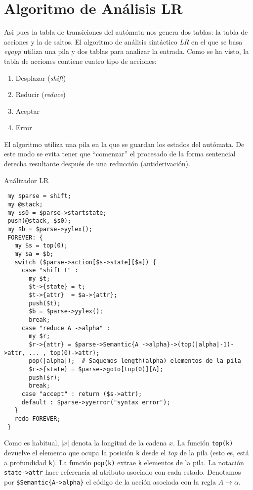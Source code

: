 \section{Algoritmo de Análisis LR}
\label{section:algoritmoLR}
Asi  pues la tabla de transiciones del autómata nos genera dos tablas:
la tabla de acciones y la de saltos.
El  algoritmo  de análisis sintáctico \emph{LR} en el  que 
se basa \emph{eyapp} utiliza una pila y dos tablas 
para analizar la entrada. %
Como se ha visto, la tabla  de acciones contiene cuatro tipo de acciones: 
\begin{enumerate}
\item
Desplazar (\emph{shift})
\item
Reducir (\emph{reduce})
\item
Aceptar
\item
Error
\end{enumerate}
El algoritmo utiliza una pila en la que se guardan los estados
del autómata. De este modo se evita tener que ``comenzar'' 
el procesado de la forma sentencial derecha resultante
después de una reducción (antiderivación).
\begin{algorithm}
\label{alg:parser}       
Análizador LR
\begin{verbatim}
 my $parse = shift;
 my @stack;
 my $s0 = $parse->startstate;
 push(@stack, $s0);
 my $b = $parse->yylex();
 FOREVER: {
   my $s = top(0); 
   my $a = $b;
   switch ($parse->action[$s->state][$a]) {
     case "shift t" : 
       my $t;
       $t->{state} = t;
       $t->{attr}  = $a->{attr};
       push($t); 
       $b = $parse->yylex();
       break;
     case "reduce A ->alpha" : 
       my $r;
       $r->{attr} = $parse->Semantic{A ->alpha}->(top(|alpha|-1)->attr, ... , top(0)->attr); 
       pop(|alpha|);  # Saquemos length(alpha) elementos de la pila
       $r->{state} = $parse->goto[top(0)][A]; 
       push($r); 
       break;
     case "accept" : return ($s->attr); 
     default : $parse->yyerror("syntax error");
   }
   redo FOREVER;
 }
\end{verbatim}
\end{algorithm}
Como es habitual, $|x|$ denota la longitud de la cadena $x$.
La función \verb|top(k)| devuelve el elemento que ocupa la 
posición \verb|k| desde el \emph{top} de la pila (esto es, está a profundidad \verb|k|).
La función \verb|pop(k)| extrae \verb|k| elementos de la pila.
La notación \verb|state->attr| hace referencia al atributo
asociado con cada estado. Denotamos por \verb|$Semantic{A->alpha}|
el código de la acción asociada con la regla $A \rightarrow \alpha$.
%

